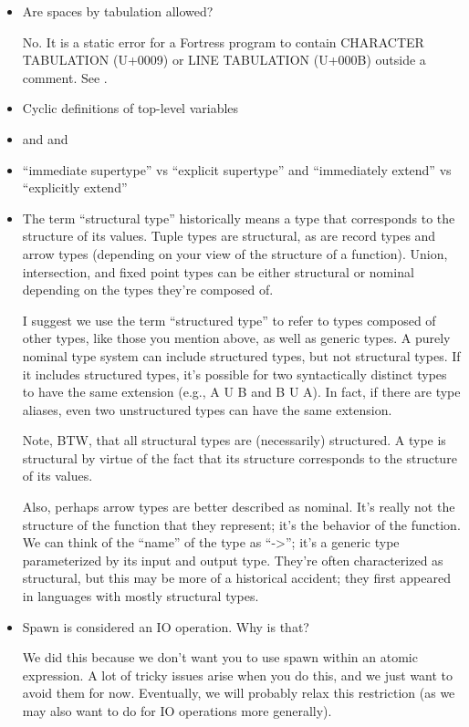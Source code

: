 \begin{itemize}
\item Are spaces by tabulation allowed?

No.  It is a static error for a Fortress program to contain CHARACTER TABULATION (U+0009) or LINE TABULATION (U+000B) outside a comment.  See .

\item Cyclic definitions of top-level variables

\item {} and  and 

\item ``immediate supertype'' vs ``explicit supertype'' and
``immediately extend'' vs ``explicitly extend''

\item The term ``structural type'' historically means a type that corresponds to
the structure of its values.  Tuple types are structural, as are record types
and arrow types (depending on your view of the structure of a function).
Union, intersection, and fixed point types can be either structural or
nominal depending on the types they're composed of.

I suggest we use the term ``structured type'' to refer to types composed of
other types, like those you mention above, as well as generic types.
A purely nominal type system can include structured types, but not structural
types.  If it includes structured types, it's possible for two syntactically
distinct types to have the same extension (e.g., A U B and B U A).  In fact,
if there are type aliases, even two unstructured types can have the same
extension.

Note, BTW, that all structural types are (necessarily) structured.  A type
is structural by virtue of the fact that its structure corresponds to the
structure of its values.

Also, perhaps arrow types are better described as nominal.  It's really not
the structure of the function that they represent; it's the behavior of the
function.  We can think of the ``name'' of the type as ``->''; it's a generic
type parameterized by its input and output type.  They're often characterized
as structural, but this may be more of a historical accident; they first
appeared in languages with mostly structural types.

\item Spawn is considered an IO operation.  Why is that?

We did this because we don't want you to use spawn within an atomic expression.  A lot of tricky issues arise when you do this, and we just want to avoid them for now.  Eventually, we will probably relax this restriction (as we may also want to do for IO operations more generally).


\end{itemize}
